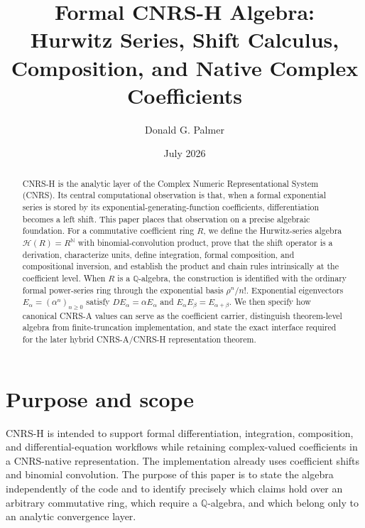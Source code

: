 \documentclass[11pt]{article}
\title{Formal CNRS-H Algebra:\\Hurwitz Series, Shift Calculus, Composition, and Native Complex Coefficients}
\author{Donald G. Palmer}
\date{July 2026}
\newcommand{\Hurs}{\mathcal H}
\newcommand{\N}{\mathbb N}
\newcommand{\Q}{\mathbb Q}
\begin{document}
\maketitle

\begin{abstract}
CNRS-H is the analytic layer of the Complex Numeric Representational System (CNRS).  Its central computational observation is that, when a formal exponential series is stored by its exponential-generating-function coefficients, differentiation becomes a left shift.  This paper places that observation on a precise algebraic foundation.  For a commutative coefficient ring $R$, we define the Hurwitz-series algebra $\Hurs(R)=R^{\N}$ with binomial-convolution product, prove that the shift operator is a derivation, characterize units, define integration, formal composition, and compositional inversion, and establish the product and chain rules intrinsically at the coefficient level.  When $R$ is a $\Q$-algebra, the construction is identified with the ordinary formal power-series ring through the exponential basis $\rho^n/n!$.  Exponential eigenvectors $E_\alpha=(\alpha^n)_{n\ge0}$ satisfy $D E_\alpha=\alpha E_\alpha$ and $E_\alpha E_\beta=E_{\alpha+\beta}$.  We then specify how canonical CNRS-A values can serve as the coefficient carrier, distinguish theorem-level algebra from finite-truncation implementation, and state the exact interface required for the later hybrid CNRS-A/CNRS-H representation theorem.
\end{abstract}

\section{Purpose and scope}

CNRS-H is intended to support formal differentiation, integration, composition, and differential-equation workflows while retaining complex-valued coefficients in a CNRS-native representation.  The implementation already uses coefficient shifts and binomial convolution.  The purpose of this paper is to state the algebra independently of the code and to identify precisely which claims hold over an arbitrary commutative ring, which require a $\Q$-algebra, and which belong only to an analytic convergence layer.
\end{document}
